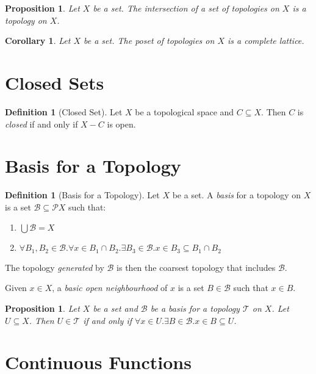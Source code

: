 \documentclass{book}
\newtheorem{corollary}{Corollary}[lemma]
\newtheorem{proposition}[lemma]{Proposition}
\theoremstyle{definition}
\newtheorem{definition}[lemma]{Definition}
\newcommand{\BB}{\ensuremath{\mathcal{B}}}
\newcommand{\PP}{\ensuremath{\mathcal{P}}}
\newcommand{\TT}{\ensuremath{\mathcal{T}}}
\newcommand{\pow}[1]{\ensuremath{\PP {#1}}}
\begin{document}
\begin{proposition}
    Let $X$ be a set. The intersection of a set of topologies on $X$ is a topology on $X$.
\end{proposition}

\begin{corollary}
    Let $X$ be a set. The poset of topologies on $X$ is a complete lattice.
\end{corollary}

\section{Closed Sets}

\begin{definition}[Closed Set]
    Let $X$ be a topological space and $C \subseteq X$. Then $C$ is \emph{closed} if and only if $X - C$ is open.
\end{definition}

\section{Basis for a Topology}

\begin{definition}[Basis for a Topology]
    Let $X$ be a set. A \emph{basis} for a topology on $X$ is a set $\BB \subseteq \pow{X}$ such that:
    \begin{enumerate}
        \item $\bigcup \BB = X$
        \item $\forall B_1, B_2 \in \BB. \forall x \in B_1 \cap B_2. \exists B_3 \in \BB. x \in B_3 \subseteq B_1 \cap B_2$
    \end{enumerate}

    The topology \emph{generated} by $\BB$ is then the coarsest topology that includes $\BB$.

    Given $x \in X$, a \emph{basic open neighbourhood} of $x$ is a set $B \in \BB$ such that $x \in B$.
\end{definition}

\begin{proposition}
    Let $X$ be a set and $\BB$ be a basis for a topology $\TT$ on $X$. Let $U \subseteq X$.
    Then $U \in \TT$ if and only if $\forall x \in U. \exists B \in \BB. x \in B \subseteq U$.
\end{proposition}

\section{Continuous Functions}
\end{document}
